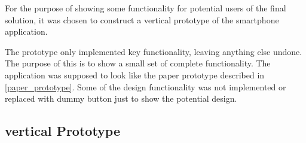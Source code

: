 For the purpose of showing some functionality for potential users of the final solution, it was chosen to construct a vertical prototype of the smartphone application.

The prototype only implemented key functionality, leaving anything else undone. The purpose of this is to show a small set of complete functionality. The application was supposed to look like the paper prototype described in \cref{paper_prototype}. Some of the design functionality was not implemented or replaced with dummy button just to show the potential design.

\subsection{vertical Prototype}
\label{sub:vertical_prototype}
